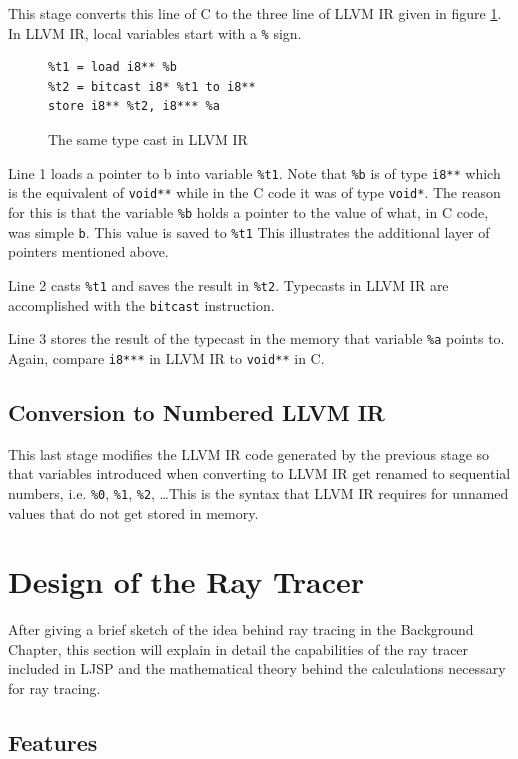 \documentclass[11pt]{report}
\begin{document}
This stage converts this line of C to the three line of LLVM IR given in figure \ref{convllvmir2}. In LLVM IR, local variables start with a \texttt{\%} sign. 

\begin{figure}[ht]
\begin{lstlisting}
%t1 = load i8** %b
%t2 = bitcast i8* %t1 to i8**
store i8** %t2, i8*** %a
\end{lstlisting}
\caption{The same type cast in LLVM IR}
\label{convllvmir2}
\end{figure}

Line 1 loads a pointer to b into variable \texttt{\%t1}. Note that \texttt{\%b} is of type \texttt{i8**} which is the equivalent of \texttt{void**} while in the C code it was of type \texttt{void*}. The reason for this is that the variable \texttt{\%b} holds a pointer to the value of what, in C code, was simple \texttt{b}. This value is saved to \texttt{\%t1} This illustrates the additional layer of pointers mentioned above.

Line 2 casts \texttt{\%t1} and saves the result in \texttt{\%t2}. Typecasts in LLVM IR are accomplished with the \texttt{bitcast} instruction.

Line 3 stores the result of the typecast in the memory that variable \texttt{\%a} points to. Again, compare \texttt{i8***} in LLVM IR to \texttt{void**} in C.

\subsection{Conversion to Numbered LLVM IR}
This last stage modifies the LLVM IR code generated by the previous stage so that variables introduced when converting to LLVM IR get renamed to sequential numbers, i.e. \texttt{\%0}, \texttt{\%1}, \texttt{\%2}, \dots This is the syntax that LLVM IR requires for unnamed values that do not get stored in memory.

\section{Design of the Ray Tracer}
After giving a brief sketch of the idea behind ray tracing in the Background Chapter, this section will explain in detail the capabilities of the ray tracer included in LJSP and the mathematical theory behind the calculations necessary for ray tracing.

\subsection{Features}
\end{document}
